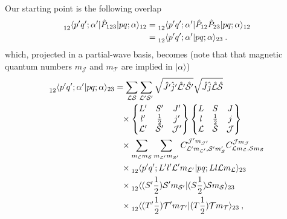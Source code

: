 \documentclass[aps,prc,showpacs,twocolumn,floatfix,nobibnotes,nofootinbib,amsmath,amssymb,longbibliography]{revtex4-2}
\begin{document}
Our starting point is the following overlap
\begin{align}
	\begin{split}
	\prescript{}{12}{\langle}p'q';\alpha'|\hat{P}_{123}|pq;\alpha\rangle_{12}
	&= \prescript{}{12}{\langle} p'q';\alpha'|\hat{P}_{12}\hat{P}_{23}|pq;\alpha\rangle_{12} \\
	&= \prescript{}{12}{\langle} p'q';\alpha'|pq;\alpha\rangle_{23} \:.
	\end{split}
\end{align}
which, projected in a partial-wave basis, becomes (note that that
magnetic quantum numbers $m_{\mathcal{J}}$ and $m_{\mathcal{T}}$ are
implied in $|\alpha\rangle$)
\begin{align}
	\begin{split}
	\prescript{}{12}{\langle p'q';\alpha'}|pq;\alpha\rangle_{23}	
	&=
	\sum_{\mathcal{L}\mathcal{S}}
	\sum_{\mathcal{L}'\mathcal{S}'}
	\sqrt{\hat{J}'\hat{j}'\hat{\mathcal{L}}'\hat{\mathcal{S}}'}
	\sqrt{\hat{J}\hat{j}\hat{\mathcal{L}}\hat{\mathcal{S}}}\\
	&\hphantom{=}\times
	\begin{Bmatrix}
	L' & S' & J' \\
	l' & \frac{1}{2} & j' \\
	\mathcal{L}' & \mathcal{S}' & \mathcal{J}'
	\end{Bmatrix}
	\begin{Bmatrix}
	L & S & J \\
	l & \frac{1}{2} & j \\
	\mathcal{L} & \mathcal{S} & \mathcal{J}
	\end{Bmatrix}\\
	&\hphantom{=}\times
	\sum_{m_{\mathcal{L}}m_{\mathcal{S}}}
	\sum_{m_{\mathcal{L}'}m_{\mathcal{S}'}} C_{\mathcal{L}'m_{\mathcal{L}'},\mathcal{S}'m_{\mathcal{S}}'}^{\mathcal{J}'m_{\mathcal{J}'}}
	C_{\mathcal{L}m_{\mathcal{L}},\mathcal{S}m_{\mathcal{S}}}^{\mathcal{J}m_{\mathcal{J}}}\\
	&\hphantom{=}\times
	\prescript{}{12}{\langle} p'q';L'l'\mathcal{L}'m_{\mathcal{L}'}|pq;Ll\mathcal{L}m_{\mathcal{L}}\rangle_{23} \\
	&\hphantom{=}\times
	\prescript{}{12}{\langle}(S'\frac{1}{2})\mathcal{S}'m_{\mathcal{S}'}|(S\frac{1}{2})\mathcal{S}m_{\mathcal{S}}\rangle_{23} \\
	&\hphantom{=}\times \prescript{}{12}{\langle}(T'\frac{1}{2})\mathcal{T}'m_{\mathcal{T}'}|(T\frac{1}{2})\mathcal{T}m_{\mathcal{T}}\rangle_{23}\:, \\
	\end{split}
	\label{eq | permutation matrix element first step}
\end{align}
\end{document}
